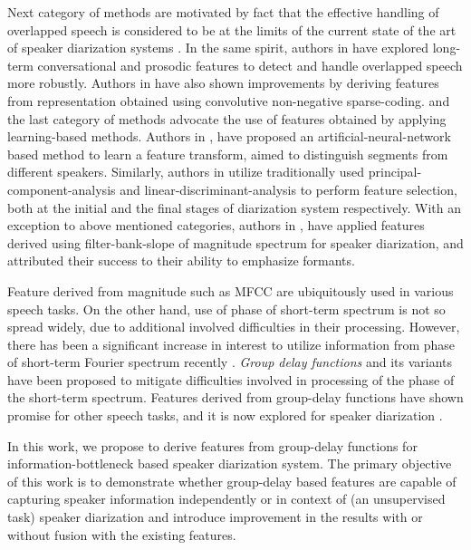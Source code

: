 \documentclass[conference]{IEEEtran}
\begin{document}
Next category of methods are motivated by fact that the effective handling of overlapped speech is considered to be at the limits of the current state of the art of speaker diarization systems \cite{reviewPaper1,featOverLap}. In the same spirit, authors in \cite{featProsody,featOverLap} have explored long-term conversational and prosodic features to detect and handle overlapped speech more robustly. Authors in \cite{featSC} have also shown improvements by deriving features from representation obtained using convolutive non-negative sparse-coding. and the last category of methods advocate the use of features obtained by applying learning-based methods. Authors in \cite{featANN}, have proposed an artificial-neural-network based method to learn a feature transform, aimed to distinguish segments from different speakers. Similarly, authors in \cite{featPCAnLDA} utilize traditionally used principal-component-analysis and linear-discriminant-analysis to perform feature selection, both at the initial and the final stages of diarization system respectively. With an exception to above mentioned categories, authors in \cite{featFilterBank}, have applied features derived using filter-bank-slope of magnitude spectrum for speaker diarization, and attributed their success to their ability to emphasize formants. 

Feature derived from magnitude such as MFCC are ubiquitously used in various speech tasks. On the other hand, use of phase of short-term spectrum is not so spread widely, due to additional involved difficulties in their processing. However, there has been a significant increase in interest to utilize information from phase of short-term Fourier spectrum recently \cite{phaseImportantInterspeech14,gdSurvey}. {\textit{Group delay functions}} and its variants have been proposed to mitigate difficulties involved in processing of the phase of the short-term spectrum. Features derived from group-delay functions have shown promise for other speech tasks, and it is now explored for speaker diarization \cite{modifiedGD,allPoleGdSid}. 

In this work, we propose to derive features from group-delay functions for information-bottleneck based speaker diarization system. The primary objective of this work is to demonstrate whether group-delay based features are capable of capturing speaker information independently or in context of (an unsupervised task) speaker diarization and introduce improvement in the results with or without fusion with the existing features. 
\end{document}
